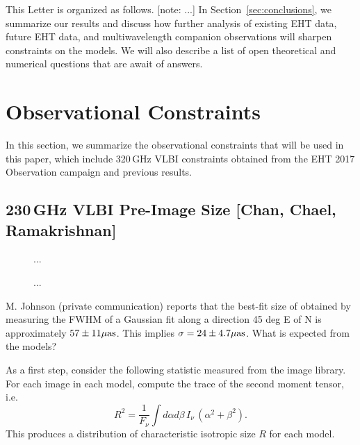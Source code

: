 \documentclass[twocolumn,tighten,dvipsnames,linenumbers]{aastex63}
\newcommand\note[1]{{\color{OliveGreen}[note: #1]}}
\begin{document}

This Letter is organized as follows.
\note{...}
In Section~\ref{sec:conclusions}, we summarize our results and discuss
how further analysis of existing EHT data, future EHT data, and
multiwavelength companion observations will sharpen constraints on the
models.
We will also describe a list of open theoretical and numerical
questions that are await of answers.

\section{Observational Constraints}
\label{sec:constraints}

In this section, we summarize the observational constraints that will
be used in this paper, which include 320\,GHz VLBI constraints
obtained from the EHT 2017 Observation campaign and previous results.

\subsection{230\,GHz VLBI Pre-Image Size
  [Chan, Chael, Ramakrishnan]}
\label{sec:230size}

\begin{figure}
  \caption{...}
  \label{fig:230sz}
\end{figure}

\begin{figure}
  \caption{...}
  \label{fig:230sz}
\end{figure}

M. Johnson (private communication) reports that the best-fit size of \sgra obtained by measuring the FWHM of a Gaussian fit along a direction 45 deg E of N is approximately $57 \pm 11 \mathrm{\mu as}$.  This implies $\sigma = 24 \pm 4.7 \mathrm{\mu as}$.  What is expected from the models?

As a first step, consider the following statistic measured from the image library.  For each image in each model, compute the trace of the second moment tensor, i.e.
\begin{equation}
  R^2 = \frac{1}{F_\nu} \int d\alpha d\beta \, I_\nu \, (\alpha^2 + \beta^2).
\end{equation}
This produces a distribution of characteristic isotropic size $R$ for each model.
\end{document}
